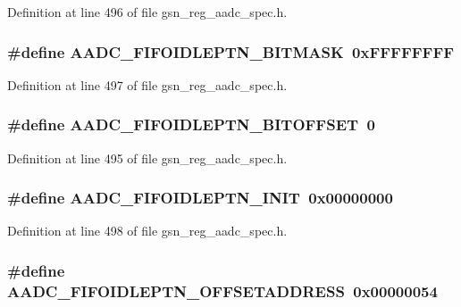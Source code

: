 Definition at line 496 of file gsn\_\-reg\_\-aadc\_\-spec.h.

\hypertarget{a00543_a61aceacf5f82d198a396848cccd80837}{
\subsubsection[{AADC\_\-FIFOIDLEPTN\_\-BITMASK}]{\setlength{\rightskip}{0pt plus 5cm}\#define AADC\_\-FIFOIDLEPTN\_\-BITMASK~0xFFFFFFFF}}
\label{a00543_a61aceacf5f82d198a396848cccd80837}


Definition at line 497 of file gsn\_\-reg\_\-aadc\_\-spec.h.

\hypertarget{a00543_a59f60d4d15aaa0ee311b6aae78649ed7}{
\subsubsection[{AADC\_\-FIFOIDLEPTN\_\-BITOFFSET}]{\setlength{\rightskip}{0pt plus 5cm}\#define AADC\_\-FIFOIDLEPTN\_\-BITOFFSET~0}}
\label{a00543_a59f60d4d15aaa0ee311b6aae78649ed7}


Definition at line 495 of file gsn\_\-reg\_\-aadc\_\-spec.h.

\hypertarget{a00543_acaccd31562863bbb7968893f79e785db}{
\subsubsection[{AADC\_\-FIFOIDLEPTN\_\-INIT}]{\setlength{\rightskip}{0pt plus 5cm}\#define AADC\_\-FIFOIDLEPTN\_\-INIT~0x00000000}}
\label{a00543_acaccd31562863bbb7968893f79e785db}


Definition at line 498 of file gsn\_\-reg\_\-aadc\_\-spec.h.

\hypertarget{a00543_a9eea3a25eedc73ba5ce32ee2da0a3f4d}{
\subsubsection[{AADC\_\-FIFOIDLEPTN\_\-OFFSETADDRESS}]{\setlength{\rightskip}{0pt plus 5cm}\#define AADC\_\-FIFOIDLEPTN\_\-OFFSETADDRESS~0x00000054}}
\label{a00543_a9eea3a25eedc73ba5ce32ee2da0a3f4d}


